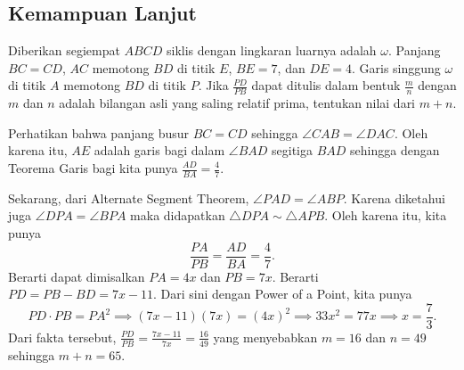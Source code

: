 \subsection{Kemampuan Lanjut}
\begin{soalbaru}
Diberikan segiempat $ABCD$ siklis dengan lingkaran luarnya adalah $\omega$. Panjang $BC=CD$, $AC$ memotong $BD$ di titik $E$, $BE=7$, dan $DE=4$. Garis singgung $\omega$ di titik $A$ memotong $BD$ di titik $P$. Jika $\frac{PD}{PB}$ dapat ditulis dalam bentuk $\frac{m}{n}$ dengan $m$ dan $n$ adalah bilangan asli yang saling relatif prima, tentukan nilai dari $m+n$.
\end{soalbaru}
\begin{solusi}
Perhatikan bahwa panjang busur $BC=CD$ sehingga $\angle CAB = \angle DAC$. Oleh karena itu, $AE$ adalah garis bagi dalam $\angle BAD$ segitiga $BAD$ sehingga dengan Teorema Garis bagi kita punya $\frac{AD}{BA}=\frac{4}{7}$.
\begin{center}
\end{center}
Sekarang, dari Alternate Segment Theorem, $\angle PAD = \angle ABP$. Karena diketahui juga $\angle DPA = \angle BPA$ maka didapatkan $\triangle DPA \sim \triangle APB$. Oleh karena itu, kita punya
$$\frac{PA}{PB} = \frac{AD}{BA} = \frac{4}{7}.$$
Berarti dapat dimisalkan $PA=4x$ dan $PB=7x$. Berarti $PD=PB-BD=7x-11$. Dari sini dengan Power of a Point, kita punya
$$PD \cdot PB = PA^2 \implies (7x-11)(7x) = (4x)^2 \implies 33x^2 = 77x \implies x = \frac{7}{3}.$$
Dari fakta tersebut, $\frac{PD}{PB} = \frac{7x-11}{7x}=\frac{16}{49}$ yang menyebabkan $m=16$ dan $n=49$ sehingga $m+n=\boxed{65}$.
\end{solusi}

